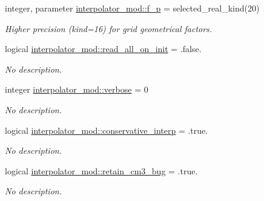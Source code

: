 \begin{DoxyCompactItemize}
integer, parameter \hyperlink{namespaceinterpolator__mod_a6fe24c8b10c7e0d39a5d6bf1b74eeb2b}{interpolator\+\_\+mod\+::f\+\_\+p} = selected\+\_\+real\+\_\+kind(20)
\begin{DoxyCompactList}\small\item\em Higher precision (kind=16) for grid geometrical factors. \end{DoxyCompactList}\item 
logical \hyperlink{namespaceinterpolator__mod_a49f7ebdd829e5d12ff598563cc5d5da3}{interpolator\+\_\+mod\+::read\+\_\+all\+\_\+on\+\_\+init} = .false.
\begin{DoxyCompactList}\small\item\em No description. \end{DoxyCompactList}\item 
integer \hyperlink{namespaceinterpolator__mod_a5d5367264c6c0ed9fee5860d5a4b7907}{interpolator\+\_\+mod\+::verbose} = 0
\begin{DoxyCompactList}\small\item\em No description. \end{DoxyCompactList}\item 
logical \hyperlink{namespaceinterpolator__mod_ae010f7c89ab86c9aa2884654abf213cd}{interpolator\+\_\+mod\+::conservative\+\_\+interp} = .true.
\begin{DoxyCompactList}\small\item\em No description. \end{DoxyCompactList}\item 
logical \hyperlink{namespaceinterpolator__mod_af73f2416a68c1ea8cc2fac7be3b4ab5e}{interpolator\+\_\+mod\+::retain\+\_\+cm3\+\_\+bug} = .true.
\begin{DoxyCompactList}\small\item\em No description. \end{DoxyCompactList}\end{DoxyCompactItemize}
